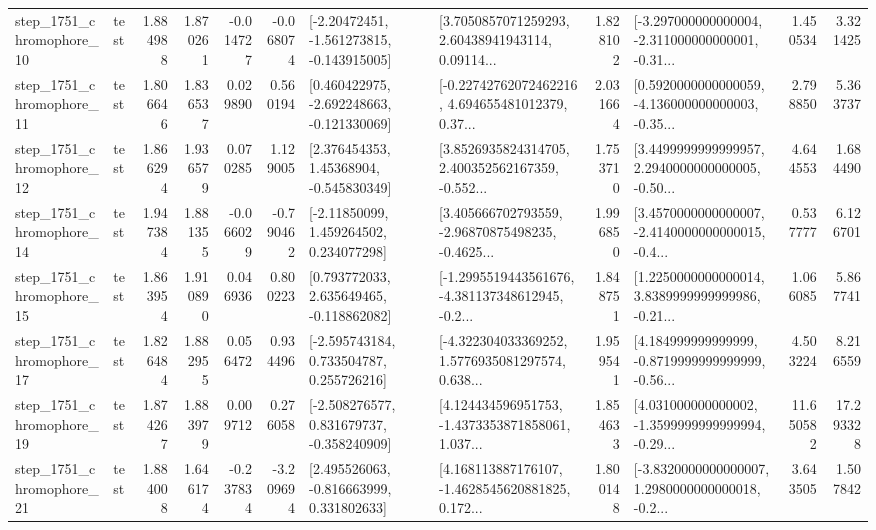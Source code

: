 \begin{tabular}{llrrrrllrlrr}
 step\_1751\_chromophore\_10 &      test &      1.884988 &    1.870261 &     -0.014727 & -0.068074 &   [-2.20472451, -1.561273815, -0.143915005] &  [3.7050857071259293, 2.60438941943114, 0.09114... &       1.828102 &  [-3.297000000000004, -2.311000000000001, -0.31... &            1.450534 &          3.321425 \\
 step\_1751\_chromophore\_11 &      test &      1.806646 &    1.836537 &      0.029890 &  0.560194 &   [0.460422975, -2.692248663, -0.121330069] &  [-0.22742762072462216, 4.694655481012379, 0.37... &       2.031664 &  [0.5920000000000059, -4.136000000000003, -0.35... &            2.798850 &          5.363737 \\
 step\_1751\_chromophore\_12 &      test &      1.866294 &    1.936579 &      0.070285 &  1.129005 &     [2.376454353, 1.45368904, -0.545830349] &  [3.8526935824314705, 2.400352562167359, -0.552... &       1.753710 &  [3.4499999999999957, 2.2940000000000005, -0.50... &            4.644553 &          1.684490 \\
 step\_1751\_chromophore\_14 &      test &      1.947384 &    1.881355 &     -0.066029 & -0.790462 &     [-2.11850099, 1.459264502, 0.234077298] &  [3.405666702793559, -2.96870875498235, -0.4625... &       1.996850 &  [3.4570000000000007, -2.4140000000000015, -0.4... &            0.537777 &          6.126701 \\
 step\_1751\_chromophore\_15 &      test &      1.863954 &    1.910890 &      0.046936 &  0.800223 &    [0.793772033, 2.635649465, -0.118862082] &  [-1.2995519443561676, -4.381137348612945, -0.2... &       1.848751 &  [1.2250000000000014, 3.8389999999999986, -0.21... &            1.066085 &          5.867741 \\
 step\_1751\_chromophore\_17 &      test &      1.826484 &    1.882955 &      0.056472 &  0.934496 &    [-2.595743184, 0.733504787, 0.255726216] &  [-4.322304033369252, 1.5776935081297574, 0.638... &       1.959541 &  [4.184999999999999, -0.8719999999999999, -0.56... &            4.503224 &          8.216559 \\
 step\_1751\_chromophore\_19 &      test &      1.874267 &    1.883979 &      0.009712 &  0.276058 &   [-2.508276577, 0.831679737, -0.358240909] &  [4.124434596951753, -1.4373353871858061, 1.037... &       1.854633 &  [4.031000000000002, -1.3599999999999994, -0.29... &           11.650582 &         17.293328 \\
 step\_1751\_chromophore\_21 &      test &      1.884008 &    1.646174 &     -0.237834 & -3.209694 &    [2.495526063, -0.816663999, 0.331802633] &  [4.168113887176107, -1.4628545620881825, 0.172... &       1.800148 &  [-3.8320000000000007, 1.2980000000000018, -0.2... &            3.643505 &          1.507842 \\

\end{tabular}
